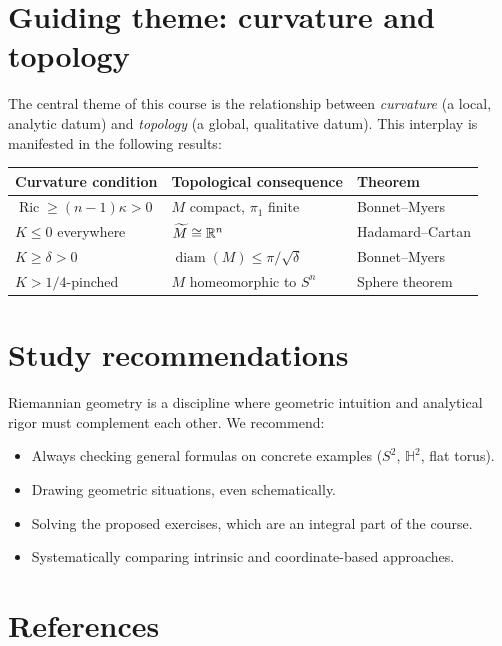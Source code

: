 \section*{Guiding theme: curvature and topology}

The central theme of this course is the relationship between \emph{curvature}
(a local, analytic datum) and \emph{topology} (a global, qualitative datum).
This interplay is manifested in the following results:

\begin{center}
\renewcommand{\arraystretch}{1.3}
\begin{tabular}{lll}
\hline
\textbf{Curvature condition} & \textbf{Topological consequence} & \textbf{Theorem} \\
\hline
$\operatorname{Ric} \geq (n-1)\kappa > 0$ & $M$ compact, $\pi_1$ finite & Bonnet--Myers \\
$K \leq 0$ everywhere & $\widetilde{M} \cong \mathbb{R}^n$ & Hadamard--Cartan \\
$K \geq \delta > 0$ & $\operatorname{diam}(M) \leq \pi/\sqrt{\delta}$ & Bonnet--Myers \\
$K > 1/4$-pinched & $M$ homeomorphic to $S^n$ & Sphere theorem \\
\hline
\end{tabular}
\end{center}

\section*{Study recommendations}

Riemannian geometry is a discipline where geometric intuition and analytical rigor
must complement each other. We recommend:
\begin{itemize}
    \item Always checking general formulas on concrete examples ($S^2$, $\mathbb{H}^2$,
          flat torus).
    \item Drawing geometric situations, even schematically.
    \item Solving the proposed exercises, which are an integral part of the course.
    \item Systematically comparing intrinsic and coordinate-based approaches.
\end{itemize}

\section*{References}

